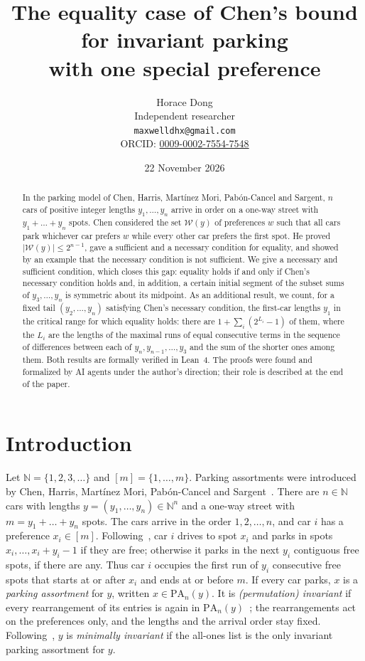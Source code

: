 \documentclass[11pt]{article}
\title{The equality case of Chen's bound for invariant parking\\
with one special preference}
\author{Horace Dong\\ \small Independent researcher\\
\small\texttt{maxwelldhx@gmail.com}\\
\small ORCID: \href{https://orcid.org/0009-0002-7554-7548}{0009-0002-7554-7548}}
\date{22 November 2026}
\theoremstyle{remark}
\newcommand{\N}{\mathbb N}
\newcommand{\W}{\mathcal W}
\newcommand{\PA}{\mathrm{PA}}
\begin{document}
\maketitle

\begin{abstract}
In the parking model of Chen, Harris, Martínez Mori, Pabón-Cancel and Sargent,
$n$ cars of positive integer lengths $y_1,\dots,y_n$ arrive in order on a
one-way street with $y_1+\dots+y_n$ spots. Chen considered the set $\W(y)$ of
preferences $w$ such that all cars park whichever car prefers $w$ while every
other car prefers the first spot. He proved $|\W(y)|\le 2^{n-1}$, gave a
sufficient and a necessary condition for equality, and showed by an example
that the necessary condition is not sufficient. We give a necessary and
sufficient condition, which closes this gap: equality holds if and only if
Chen's necessary condition holds and, in addition, a certain initial segment of
the subset sums of $y_3,\dots,y_n$ is symmetric about its midpoint. As an
additional result, we count, for a fixed tail $(y_2,\dots,y_n)$ satisfying
Chen's necessary condition,
the first-car lengths $y_1$ in the critical range for which equality holds:
there are $1+\sum_i(2^{L_i}-1)$ of them, where the $L_i$ are the lengths of the
maximal runs of equal consecutive terms in the sequence of differences between
each of $y_n,y_{n-1},\dots,y_3$ and the sum of the shorter ones among them. Both results are formally
verified in Lean~4. The proofs were found and formalized by AI agents under the
author's direction; their role is described at the end of the paper.
\end{abstract}

\section{Introduction}

Let $\N=\{1,2,3,\dots\}$ and $[m]=\{1,\dots,m\}$. Parking assortments were
introduced by Chen, Harris, Martínez Mori, Pabón-Cancel and
Sargent~\cite{chmps}. There are $n\in\N$ cars with lengths
$y=(y_1,\dots,y_n)\in\N^n$ and a one-way street with $m=y_1+\dots+y_n$ spots.
The cars arrive in the order $1,2,\dots,n$, and car $i$ has a preference
$x_i\in[m]$. Following~\cite[Definition~1.3]{chen}, car $i$ drives to spot
$x_i$ and parks in spots $x_i,\dots,x_i+y_i-1$ if they are free; otherwise it
parks in the next $y_i$ contiguous free spots, if there are any. Thus car $i$
occupies the first run of $y_i$ consecutive free spots that starts at or after
$x_i$ and ends at or before $m$.
If every car parks, $x$ is a \emph{parking assortment} for $y$, written
$x\in\PA_n(y)$. It is \emph{(permutation) invariant} if every rearrangement of
its entries is again in $\PA_n(y)$~\cite[Definition~1.5]{chen}; the
rearrangements act on the preferences only, and the lengths and the arrival
order stay fixed. Following~\cite[Definition~4.1]{chmps}, $y$ is
\emph{minimally invariant} if the all-ones list is the only invariant parking
assortment for $y$.
\end{document}
